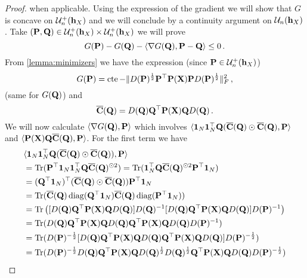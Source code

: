 \begin{proof}
	when applicable. Using the expression of the gradient we will show that $G$ is concave on ${\mathcal{U}}^{+}_n({\mathbf{h}}_X)$ and we will conclude by a continuity argument on ${\mathcal{U}}_n({\mathbf{h}}_X)$. Take $({\mathbf{P}}, {\mathbf{Q}}) \in {\mathcal{U}}^{+}_n({\mathbf{h}}_X) \times {\mathcal{U}}^{+}_n({\mathbf{h}}_X)$ we will prove
	\begin{equation}
		G({\mathbf{P}}) - G({\mathbf{Q}}) - \langle \nabla G({\mathbf{Q}}), {\mathbf{P}} -{\mathbf{Q}} \rangle \leq 0\,.
	\end{equation}
	From \cref{lemma:minimizers} we have the expression (since ${\mathbf{P}} \in {\mathcal{U}}^{+}_n({\mathbf{h}}_X)$)
	\begin{equation}
		G({\mathbf{P}}) = \operatorname{cte} - \|D({\mathbf{P}})^{\frac{1}{2}} {\mathbf{P}}^\top {\mathbf{P}}({\mathbf{X}}) {\mathbf{P}} D({\mathbf{P}})^{\frac{1}{2}}\|_F^2\,,
	\end{equation}
	(same for $G({\mathbf{Q}})$) and
	\begin{equation}
		\overline{{\mathbf{C}}}({\mathbf{Q}}) = D({\mathbf{Q}}) {\mathbf{Q}}^\top {\mathbf{P}}({\mathbf{X}}){\mathbf{Q}} D({\mathbf{Q}})\,.
	\end{equation}
	We will now calculate $\langle \nabla G({\mathbf{Q}}), {\mathbf{P}} \rangle$ which involves $\langle \bm{1}_N \bm{1}_N^\top {\mathbf{Q}} (\overline{{\mathbf{C}}}({\mathbf{Q}}) \odot \overline{{\mathbf{C}}}({\mathbf{Q}}),{\mathbf{P}} \rangle$ and $\langle {\mathbf{P}}({\mathbf{X}}) {\mathbf{Q}} \overline{{\mathbf{C}}}({\mathbf{Q}}),{\mathbf{P}} \rangle$. For the first term we have
	\begin{equation}
		\begin{split}
			&\langle \one_N \one_N^\top \mQ (\overline{\mC}(\mQ) \odot \overline{\mC}(\mQ)),\mP \rangle \\
			&=
			\tr(\mP^\top \one_N \one_N^\top \mQ \overline{\mC}(\mQ)^{\odot 2})  =  \tr(\one_N^\top \mQ \overline{\mC}(\mQ)^{\odot 2} \mP^\top \one_N)  \\
			&= (\mQ^\top\one_N)^\top (\overline{\mC}(\mQ) \odot \overline{\mC}(\mQ)) \mP^\top \one_N\\
			&= \tr(\overline{\mC}(\mQ) \diag(\mQ^\top \one_N) \overline{\mC}(\mQ) \diag(\mP^\top \one_N)) \\
			&= \tr\left([D(\mQ) \mQ^\top \simiX(\mX) \mQ D(\mQ)] D(\mQ)^{-1} [D(\mQ) \mQ^\top \simiX(\mX) \mQ D(\mQ)] D(\mP)^{-1}\right) \\
			&=\tr(D(\mQ) \mQ^\top \simiX(\mX) \mQ D(\mQ) \mQ^\top \simiX(\mX) \mQ D(\mQ) D(\mP)^{-1}) \\
			&=\tr(D(\mP)^{-\frac{1}{2}} [D(\mQ) \mQ^\top \simiX(\mX) \mQ D(\mQ) \mQ^\top \simiX(\mX) \mQ D(\mQ)] D(\mP)^{-\frac{1}{2}}) \\
			&=\tr(D(\mP)^{-\frac{1}{2}} D(\mQ) \mQ^\top \simiX(\mX) \mQ D(\mQ)^{\frac{1}{2}} D(\mQ)^{\frac{1}{2}} \mQ^\top \simiX(\mX) \mQ D(\mQ) D(\mP)^{-\frac{1}{2}}) \\

\end{split}
\end{equation}
\end{proof}
